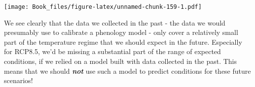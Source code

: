 \documentclass[
]{book}
\newenvironment{Shaded}{\begin{snugshade}}{\end{snugshade}}
\newcommand{\DataTypeTok}[1]{\textcolor[rgb]{0.13,0.29,0.53}{#1}}
\newcommand{\DecValTok}[1]{\textcolor[rgb]{0.00,0.00,0.81}{#1}}
\newcommand{\FloatTok}[1]{\textcolor[rgb]{0.00,0.00,0.81}{#1}}
\newcommand{\KeywordTok}[1]{\textcolor[rgb]{0.13,0.29,0.53}{\textbf{#1}}}
\newcommand{\NormalTok}[1]{#1}
\newcommand{\OperatorTok}[1]{\textcolor[rgb]{0.81,0.36,0.00}{\textbf{#1}}}
\newcommand{\StringTok}[1]{\textcolor[rgb]{0.31,0.60,0.02}{#1}}
\begin{document}
\begin{Shaded}
\end{Shaded}

\texttt{[image: Book\_files/figure-latex/unnamed-chunk-159-1.pdf]}

We see clearly that the data we collected in the past - the data we would presumably use to calibrate a phenology model - only cover a relatively small part of the temperature regime that we should expect in the future. Especially for RCP8.5, we'd be missing a substantial part of the range of expected conditions, if we relied on a model built with data collected in the past. This means that we should \textbf{\emph{not}} use such a model to predict conditions for these future scenarios!
\end{document}
